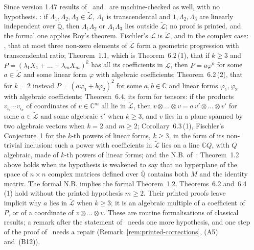 \documentclass[11pt,a4paper]{article}
\theoremstyle{plain}
\theoremstyle{definition}
\newcommand{\C}{\mathbb{C}}
\newcommand{\Alg}{\overline{\mathbb{Q}}}
\newcommand{\aLogs}{\widetilde{\mathcal{L}}}
\begin{document}
Since version 1.47 results of~\cite{waldschmidt-2005b} and~\cite{fischler-2001} are machine-checked as well, with
no hypothesis. \cite[Corollary~1.3]{waldschmidt-2005b}: if $\Lambda_{1},\Lambda_{2},\Lambda_{3}\in\aLogs$,
$\Lambda_{1}$ is transcendental and $1,\Lambda_{2},\Lambda_{3}$ are linearly independent over $\Alg$, then
$\Lambda_{1}\Lambda_{2}$ or $\Lambda_{1}\Lambda_{3}$ lies outside $\aLogs$; no proof is printed, and the formal one
applies Roy's theorem. Fischler's $\mathcal{L}$ is $\aLogs$, and in the complex case:
\cite[Lemma~6.1]{fischler-2001}, that at most three non-zero elements of $\aLogs$ form a geometric
progression with transcendental ratio; Theorem~1.1, which is Theorem~6.2\,(1), that if $k\geq3$ and
$P=(\lambda_{1}X_{1}+\dots+\lambda_{m}X_{m})^{k}$ has all its coefficients in $\aLogs$, then $P=a\varphi^{k}$ for some
$a\in\aLogs$ and some linear form $\varphi$ with algebraic coefficients; Theorem~6.2\,(2), that for $k=2$ instead
$P=(a\varphi_{1}+b\varphi_{2})^{2}$ for some $a,b\in\C$ and linear forms $\varphi_{1},\varphi_{2}$ with algebraic
coefficients; Theorem~6.4, its form for tensors: if the products $v_{i_{1}}\cdots v_{i_{k}}$ of coordinates of
$v\in\C^{m}$ all lie in $\aLogs$, then $v\otimes\dots\otimes v=a\,v'\otimes\dots\otimes v'$ for some $a\in\aLogs$ and
some algebraic $v'$ when $k\geq3$, and $v$ lies in a plane spanned by two algebraic vectors when $k=2$ and $m\geq2$;
Corollary~6.3\,(1), Fischler's Conjecture~1 for the $k$-th powers of linear forms, $k\geq3$, in the form of its
non-trivial inclusion: such a power with coefficients in $\aLogs$ lies on a line $\C Q$, with $Q$ algebraic, made of
$k$-th powers of linear forms; and the N.B. of~\cite[p.~183]{fischler-2001}: Theorem~1.2 above holds when its
hypothesis is weakened to say that no hyperplane of the space of $n\times n$ complex matrices defined over $\Alg$
contains both $M$ and the identity matrix. The formal N.B. implies the formal Theorem~1.2. Theorems~6.2
and~6.4\,(1) hold without the printed hypothesis $m\geq2$. Their printed proofs leave implicit why $a$ lies in
$\aLogs$ when $k\geq3$; it is an algebraic multiple of a coefficient of $P$, or of a coordinate of
$v\otimes\dots\otimes v$. These are routine formalisations of classical results; a remark after the statement
of~\cite[Theorem~1.2]{waldschmidt-2005b} needs one more hypothesis, and one step of the proof
of~\cite[Proposition~5.7]{fischler-2001} needs a repair (Remark~\ref{rem:printed-corrections}, (A5) and~(B12)).
\end{document}

